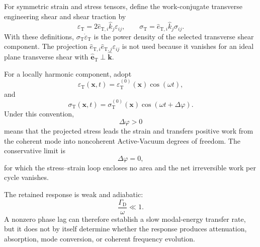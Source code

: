 For symmetric strain and stress tensors, define the work-conjugate transverse
engineering shear and shear traction by
\begin{equation}
    \varepsilon_{\mathrm T}
    =
    2
    \widehat e_{\mathrm T,i}
    \widehat k_j
    \varepsilon_{ij},
    \qquad
    \sigma_{\mathrm T}
    =
    \widehat e_{\mathrm T,i}
    \widehat k_j
    \sigma_{ij}.
    \label{eq:photon_relaxation_modal_projection}
\end{equation}
With these definitions,
\(\sigma_{\mathrm T}\dot{\varepsilon}_{\mathrm T}\)
is the power density of the selected transverse shear component. The
projection
\(\widehat e_{\mathrm T,i}\widehat e_{\mathrm T,j}\varepsilon_{ij}\)
is not used because it vanishes for an ideal plane transverse shear with
\(\widehat{\mathbf e}_{\mathrm T}\perp\widehat{\mathbf k}\).

For a locally harmonic component, adopt
\begin{equation}
    \varepsilon_{\mathrm T}(\mathbf x,t)
    =
    \varepsilon_{\mathrm T}^{(0)}(\mathbf x)
    \cos
    \left(
        \omega t
    \right),
    \label{eq:photon_relaxation_modal_strain}
\end{equation}
and
\begin{equation}
    \sigma_{\mathrm T}(\mathbf x,t)
    =
    \sigma_{\mathrm T}^{(0)}(\mathbf x)
    \cos
    \left(
        \omega t
        +
        \Delta\varphi
    \right).
    \label{eq:photon_relaxation_modal_stress}
\end{equation}
Under this convention,
\begin{equation}
    \Delta\varphi
    >
    0
    \label{eq:photon_relaxation_positive_phase_lag}
\end{equation}
means that the projected stress leads the strain and transfers positive work
from the coherent mode into noncoherent Active-Vacuum degrees of freedom. The
conservative limit is
\begin{equation}
    \Delta\varphi
    =
    0,
    \label{eq:photon_relaxation_zero_phase_lag}
\end{equation}
for which the stress--strain loop encloses no area and the net irreversible
work per cycle vanishes.

The retained response is weak and adiabatic:
\begin{equation}
    \frac{
        \Gamma_{\mathrm D}
    }{
        \omega
    }
    \ll
    1.
    \label{eq:photon_relaxation_weak_loss_condition}
\end{equation}
A nonzero phase lag can therefore establish a slow modal-energy transfer rate,
but it does not by itself determine whether the response produces attenuation,
absorption, mode conversion, or coherent frequency evolution.

